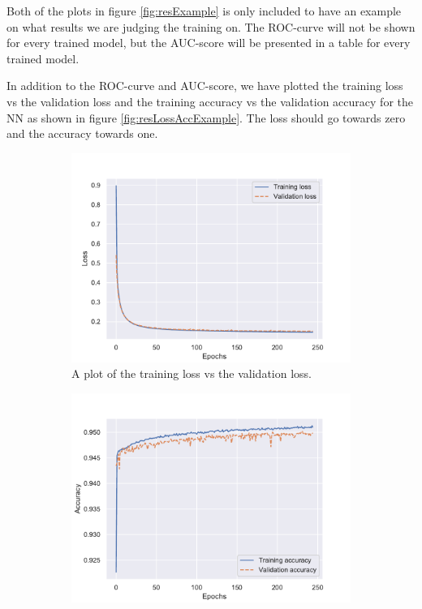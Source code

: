 Both of the plots in figure \ref{fig:resExample} is only included to have an example on what results we are judging the training on. The ROC-curve will not be shown for every trained model, but the AUC-score will be presented in a table for every trained model.

In addition to the ROC-curve and AUC-score, we have plotted the training loss vs the validation loss and the training accuracy vs the validation accuracy for the NN as shown in figure \ref{fig:resLossAccExample}. The loss should go towards zero and the accuracy towards one. 

\begin{figure}[H]
    \centering
    \begin{subfigure}[t!]{0.49\textwidth}
        \includegraphics[width = \textwidth]{Figures/SlepSlep/ML/NN/High_level/Inter/Loss_sig_slepslep_high_level_inter.pdf}
        \caption{A plot of the training loss vs the validation loss.}
        \label{fig:LossExample}
    \end{subfigure}
    \begin{subfigure}[t!]{0.49\textwidth}
        \includegraphics[width = \textwidth]{Figures/SlepSlep/ML/NN/High_level/Inter/Accuracy_sig_slepslep_high_level_inter.pdf}

\end{subfigure}
\end{figure}
